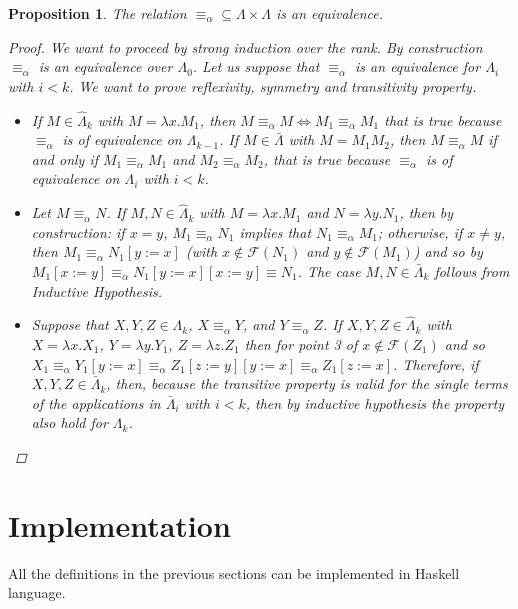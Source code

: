 \documentclass[a4paper,11pt]{article}
\newtheorem{prop}{Proposition}
\theoremstyle{definition}
\newcommand{\FF}{\mathcal{F}}
\begin{document}
\begin{prop}
  The relation $\equiv_\alpha \subseteq \Lambda\times\Lambda$ is an
  equivalence.
  \begin{proof}
    We want to proceed by strong induction over the rank.
    By construction $\equiv_\alpha$ is an equivalence over $\Lambda_0$. Let
    us suppose that $\equiv_\alpha$ is an equivalence for $\Lambda_i$ with
    $i<k$. We want to prove \textit{reflexivity, symmetry and transitivity} property.
    \begin{itemize}
      \item[Reflex.] If $M\in\hat\Lambda_k$ with $M=\lambda x.M_1$, then
        $M\equiv_\alpha M\iff M_1\equiv_\alpha M_1$ that is true because
        $\equiv_\alpha$ is of equivalence on $\Lambda_{k-1}$. If
        $M\in\bar\Lambda$ with $M=M_1M_2$, then $M\equiv_\alpha M$ if and only 
        if $M_1\equiv_\alpha M_1$ and $M_2\equiv_\alpha M_2$, that is true 
        because $\equiv_\alpha$ is of equivalence on $\Lambda_i$ with $i<k$. 
      \item[Symmet.]
        Let $M\equiv_\alpha N$. If $M,N\in\hat\Lambda_k$ with $M=\lambda x.M_1$
        and $N=\lambda y.N_1$, then by construction: if $x=y$, $M_1\equiv_\alpha
        N_1$ implies that $N_1\equiv_\alpha M_1$; otherwise, if $x\ne y$,
        then $M_1\equiv_\alpha N_1[y:=x]$ (with $x\not\in\FF(N_1)$ and
        $y\not\in\FF(M_1)$) and so by  $M_1[x:=y]\equiv_\alpha 
        N_1[y:=x][x:=y]\equiv N_1$. The case $M,N\in\bar\Lambda_k$ follows
        from Inductive Hypothesis.
      \item [Trans.] Suppose that $X,Y,Z\in\Lambda_k$, $X \equiv_\alpha Y$,
        and $Y\equiv_\alpha Z$. If $X,Y,Z\in\hat\Lambda_k$ with 
        $X=\lambda x.X_1$, $Y=\lambda y.Y_1$, $Z=\lambda z.Z_1$ then for
        point 3 of  $x\not\in\FF(Z_1)$ and so
        $X_1\equiv_\alpha Y_1[y:=x]\equiv_\alpha Z_1[z:=y][y:=x]\equiv_\alpha
        Z_1[z:=x]$. Therefore, if $X,Y,Z\in\bar\Lambda_k$, then, because 
        the transitive property is valid for the single terms of the
        applications in $\bar\Lambda_i$ with $i<k$, then by inductive
        hypothesis the property also hold for $\Lambda_k$.
    \end{itemize}
  \end{proof}
\end{prop}

\section{Implementation}
\label{sec:implementation}
All the definitions in the previous sections can be implemented in Haskell
language. 
\end{document}
